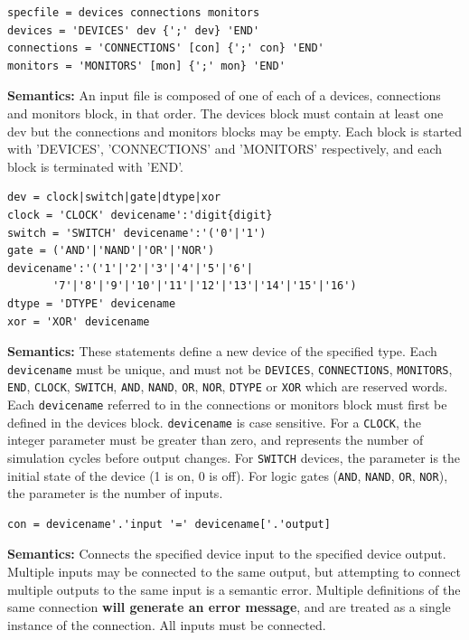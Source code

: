 \documentclass[a4paper,10pt]{article}
\begin{document}
\begin{verbatim}
specfile = devices connections monitors
devices = 'DEVICES' dev {';' dev} 'END'
connections = 'CONNECTIONS' [con] {';' con} 'END' 
monitors = 'MONITORS' [mon] {';' mon} 'END'
\end{verbatim} 

\textbf{Semantics:} An input file is composed of one of each of a devices, connections and monitors block, in that order. The devices block must contain at least one dev but the connections and monitors blocks may be empty. Each block is started with 'DEVICES', 'CONNECTIONS' and 'MONITORS' respectively, and each block is terminated with 'END'.

\begin{verbatim}
dev = clock|switch|gate|dtype|xor
clock = 'CLOCK' devicename':'digit{digit}
switch = 'SWITCH' devicename':'('0'|'1')
gate = ('AND'|'NAND'|'OR'|'NOR') devicename':'('1'|'2'|'3'|'4'|'5'|'6'|
       '7'|'8'|'9'|'10'|'11'|'12'|'13'|'14'|'15'|'16')
dtype = 'DTYPE' devicename
xor = 'XOR' devicename
\end{verbatim} 

\textbf{Semantics:} These statements define a new device of the specified type. Each \texttt{devicename} must be unique, and must not be \texttt{DEVICES}, \texttt{CONNECTIONS}, \texttt{MONITORS}, \texttt{END}, \texttt{CLOCK}, \texttt{SWITCH}, \texttt{AND}, \texttt{NAND}, \texttt{OR}, \texttt{NOR}, \texttt{DTYPE} or \texttt{XOR} which are reserved words.
Each \texttt{devicename} referred to in the connections or monitors block must first be defined in the devices block. \texttt{devicename} is case sensitive. For a \texttt{CLOCK}, the integer parameter must be greater than zero, and represents the number of simulation cycles before output changes. For \texttt{SWITCH} devices, the parameter is the initial state of the device (1 is on, 0 is off).
For logic gates (\texttt{AND}, \texttt{NAND}, \texttt{OR}, \texttt{NOR}), the parameter is the number of inputs.

\begin{verbatim}
con = devicename'.'input '=' devicename['.'output]
\end{verbatim} 
\textbf{Semantics:} Connects the specified device input to the specified device output. Multiple inputs may be connected to the same output, but attempting to connect multiple outputs to the same input is a semantic error. Multiple definitions of the same connection \textbf{\huge will generate an error message}, and are treated as a single instance of the connection. All inputs must be connected.
\end{document}
